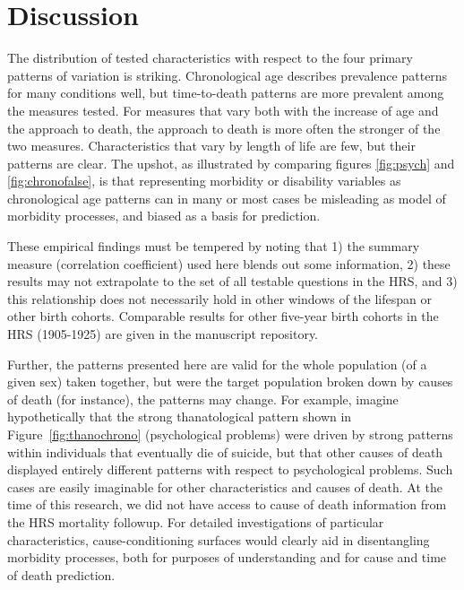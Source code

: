 \documentclass[11pt,oneside]{article} %
\begin{document}
\section*{Discussion}
The distribution of tested characteristics with respect to the
four primary patterns of variation is
striking. Chronological age describes prevalence patterns for many conditions
well, but time-to-death patterns are more prevalent among the measures
tested.
For measures that vary both with the increase of age and the approach to death, the approach to
death is more often the stronger of the two measures. Characteristics that vary
by length of life are few, but their patterns are clear. The upshot, as
illustrated by comparing figures \ref{fig:psych} and \ref{fig:chronofalse}, is
that representing morbidity or disability variables as chronological age
patterns can in many or most cases be misleading as model of morbidity
processes, and biased as a basis for prediction.

These empirical
findings must be tempered by noting that 1) the summary measure (correlation
coefficient) used here blends out some information, 2) these results may not
extrapolate to the set of all testable questions in the HRS, and 3)
this relationship does not necessarily hold in other windows of the lifespan or
other birth cohorts. Comparable results for other five-year birth cohorts
in the HRS (1905-1925) are given in the manuscript repository. 

Further, the patterns
presented here are valid for the whole population (of a given sex) taken
together, but were the target population broken down by causes of death (for
instance), the patterns may change. For example, imagine hypothetically that the
strong thanatological pattern shown in Figure~\ref{fig:thanochrono}
(psychological problems) were driven by strong patterns within individuals that
eventually die of suicide, but that other causes of death displayed entirely different patterns with respect to
psychological problems. Such cases are easily imaginable for other
characteristics and causes of death. At the time of this research, we did not
have access to cause of death information from the HRS mortality followup. For
detailed investigations of particular characteristics, cause-conditioning
surfaces would clearly aid in disentangling morbidity processes, both for
purposes of understanding and for cause and time of death prediction.
\end{document}
